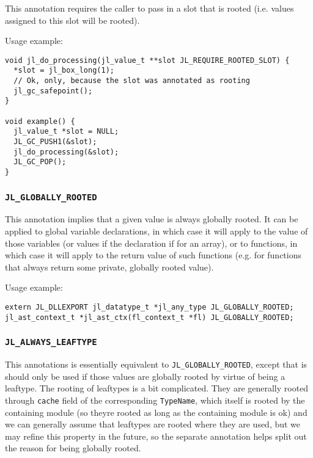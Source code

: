 This annotation requires the caller to pass in a slot that is rooted (i.e. values assigned to this slot will be rooted).



Usage example:




\begin{lstlisting}
void jl_do_processing(jl_value_t **slot JL_REQUIRE_ROOTED_SLOT) {
  *slot = jl_box_long(1);
  // Ok, only, because the slot was annotated as rooting
  jl_gc_safepoint();
}

void example() {
  jl_value_t *slot = NULL;
  JL_GC_PUSH1(&slot);
  jl_do_processing(&slot);
  JL_GC_POP();
}
\end{lstlisting}



\hypertarget{11329720779284449718}{}


\subsubsection{\texttt{JL\_GLOBALLY\_ROOTED}}



This annotation implies that a given value is always globally rooted. It can be applied to global variable declarations, in which case it will apply to the value of those variables (or values if the declaration if for an array), or to functions, in which case it will apply to the return value of such functions (e.g. for functions that always return some private, globally rooted value).



Usage example:




\begin{lstlisting}
extern JL_DLLEXPORT jl_datatype_t *jl_any_type JL_GLOBALLY_ROOTED;
jl_ast_context_t *jl_ast_ctx(fl_context_t *fl) JL_GLOBALLY_ROOTED;
\end{lstlisting}



\hypertarget{503057295712361449}{}


\subsubsection{\texttt{JL\_ALWAYS\_LEAFTYPE}}



This annotations is essentially equivalent to \texttt{JL\_GLOBALLY\_ROOTED}, except that is should only be used if those values are globally rooted by virtue of being a leaftype. The rooting of leaftypes is a bit complicated. They are generally rooted through \texttt{cache} field of the corresponding \texttt{TypeName}, which itself is rooted by the containing module (so they{\textquotesingle}re rooted as long as the containing module is ok) and we can generally assume that leaftypes are rooted where they are used, but we may refine this property in the future, so the separate annotation helps split out the reason for being globally rooted.



